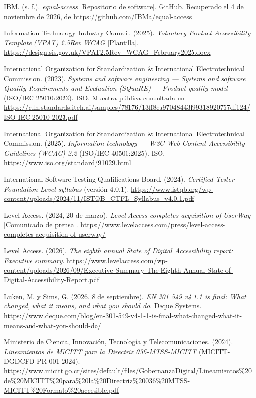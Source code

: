 \documentclass[10pt,letterpaper,onecolumn]{IEEEtran}
\begin{document}
IBM. (s. f.). \emph{equal-access} {[}Repositorio de software{]}. GitHub. Recuperado el 4 de noviembre de 2026, de \url{https://github.com/IBMa/equal-access}

Information Technology Industry Council. (2025). \emph{Voluntary Product Accessibility Template (VPAT) 2.5Rev WCAG} {[}Plantilla{]}. \url{https://design.sis.gov.uk/VPAT2.5Rev_WCAG_February2025.docx}

International Organization for Standardization \& International Electrotechnical Commission. (2023). \emph{Systems and software engineering --- Systems and software Quality Requirements and Evaluation (SQuaRE) --- Product quality model} (ISO/IEC 25010:2023). ISO. Muestra pública consultada en \url{https://cdn.standards.iteh.ai/samples/78176/13ff8ea97048443f99318920757df124/ISO-IEC-25010-2023.pdf}

International Organization for Standardization \& International Electrotechnical Commission. (2025). \emph{Information technology --- W3C Web Content Accessibility Guidelines (WCAG) 2.2} (ISO/IEC 40500:2025). ISO. \url{https://www.iso.org/standard/91029.html}

International Software Testing Qualifications Board. (2024). \emph{Certified Tester Foundation Level syllabus} (versión 4.0.1). \url{https://www.istqb.org/wp-content/uploads/2024/11/ISTQB_CTFL_Syllabus_v4.0.1.pdf}

Level Access. (2024, 20 de marzo). \emph{Level Access completes acquisition of UserWay} {[}Comunicado de prensa{]}. \url{https://www.levelaccess.com/press/level-access-completes-acquisition-of-userway/}

Level Access. (2026). \emph{The eighth annual State of Digital Accessibility report: Executive summary}. \url{https://www.levelaccess.com/wp-content/uploads/2026/09/Executive-Summary-The-Eighth-Annual-State-of-Digital-Accessibility-Report.pdf}

Luken, M. y Sims, G. (2026, 8 de septiembre). \emph{EN 301 549 v4.1.1 is final: What changed, what it means, and what you should do}. Deque Systems. \url{https://www.deque.com/blog/en-301-549-v4-1-1-is-final-what-changed-what-it-means-and-what-you-should-do/}

Ministerio de Ciencia, Innovación, Tecnología y Telecomunicaciones. (2024). \emph{Lineamientos de MICITT para la Directriz 036-MTSS-MICITT} (MICITT-DGDCFD-PR-001-2024). \url{https://www.micitt.go.cr/sites/default/files/GobernanzaDigital/Lineamientos\%20de\%20MICITT\%20para\%20la\%20Directriz\%20036\%20MTSS-MICITT\%20Formato\%20accesible.pdf}
\end{document}
